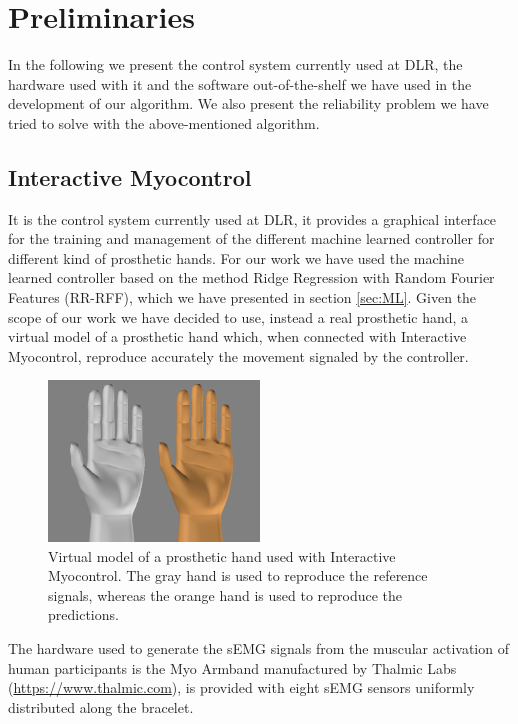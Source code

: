 \chapter{Preliminaries}\label{ch:preliminaries}
In the following we present the control system currently used at DLR, the hardware used with it and the software out-of-the-shelf we have used in the development of our algorithm. We also present the reliability problem we have tried to solve with the above-mentioned algorithm. 
\section{Interactive Myocontrol}\label{sec:interactivemyocontrol}
It is the control system currently used at DLR, it provides a graphical interface for the training and management of the different machine learned controller for different kind of prosthetic hands. For our work we have used the machine learned controller based on the method Ridge Regression with Random Fourier Features (RR-RFF), which we have presented in section \ref{sec:ML}. Given the scope of our work we have decided to use, instead a real prosthetic hand, a virtual model of a prosthetic hand which, when connected with Interactive Myocontrol, reproduce accurately the movement signaled by the controller.
\begin{figure}[ht]
    \centering
    \includegraphics[width=0.5\textwidth]{Images/Blender.PNG}
    \caption{Virtual model of a prosthetic hand used with Interactive Myocontrol. The gray hand is used to reproduce the reference signals, whereas the orange hand is used to reproduce the predictions.}
    \label{fig:hand-blender}
\end{figure}
The hardware used to generate the sEMG signals from the muscular activation of human participants is the Myo Armband manufactured by Thalmic Labs (\href{https://www.thalmic.com}{https://www.thalmic.com}), is provided with eight sEMG sensors uniformly distributed along the bracelet.
